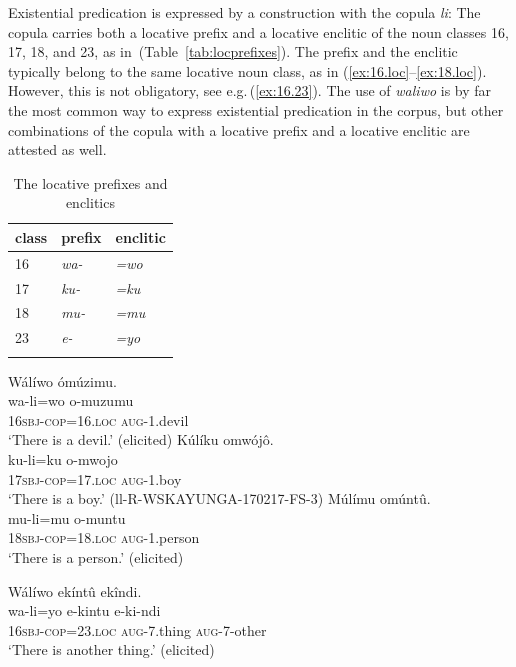 \documentclass[output=paper,colorlinks,citecolor=brown,draftmode]{langscibook}
\begin{document}
Existential predication is expressed by a construction with the copula \textit{li}: The copula carries both a locative prefix and a locative enclitic of the noun classes 16, 17, 18, and 23, as in~(Table~\ref{tab:locprefixes}).  
The prefix and the enclitic typically belong to the same locative noun class, as in  (\ref{ex:16.loc}--\ref{ex:18.loc}). 
However, this is not obligatory, see e.g.\,(\ref{ex:16.23}). 
The use of \textit{waliwo} is by far the most common way to express  existential predication in the corpus, but other combinations of the copula with a locative prefix and a locative enclitic are attested as well.

\begin{table}
\caption{The locative prefixes and enclitics}
\label{tab:locprefixes}
	\begin{tabular}{lll}
\lsptoprule
	class&prefix&enclitic\\
\midrule
	16&\textit{wa-}&\textit{=wo}\\
	17&\textit{ku-}&\textit{=ku}\\
	18&\textit{mu-}&\textit{=mu}\\
	23&\textit{e-}&\textit{=yo}\\
\lspbottomrule
	\end{tabular}
\label{tab:locatives}
\end{table}

\ea \label{ex:existential}
\begin{xlist}
\ex \label{ex:16.loc}
	\glll   Wálíwo ómúzimu.\\
	        wa-li=wo o-muzumu\\
		    16\textsc{sbj}-\textsc{cop}=16.\textsc{loc} \textsc{aug}-1.devil\\
	\glt ‘There is a devil.’ (elicited)
\ex \label{ex:17.loc}
	\glll   Kúlíku omwójô.\\
	        ku-li=ku o-mwojo\\
	    	\textsc{17sbj}-\textsc{cop}=17.\textsc{loc} \textsc{aug}-1.boy\\
	\glt ‘There is a boy.’ 	(ll-R-WSKAYUNGA-170217-FS-3)
\ex \label{ex:18.loc}
	\glll   Múlímu omúntû.\\
	        mu-li=mu o-muntu\\
		    18\textsc{sbj}-\textsc{cop}=18.\textsc{loc} \textsc{aug}-1.person\\
	\glt ‘There is a person.’ (elicited)

\ex \label{ex:16.23}
	\glll   Wálíwo ekíntû ekîndi.\\
	        wa-li=yo e-kintu e-ki-ndi\\
		    16\textsc{sbj}-\textsc{cop}=23.\textsc{loc} \textsc{aug}-7.thing \textsc{aug}-7-other\\
	\glt ‘There is another thing.’ 	(elicited)
\end{xlist}
\z
\end{document}
